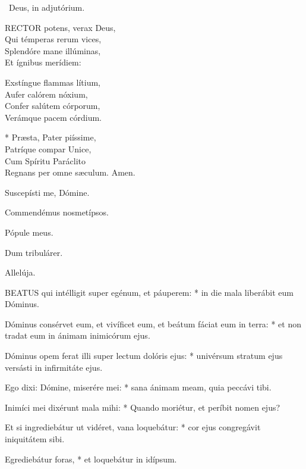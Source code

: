\V\ Deus, in adjutórium.


\lettrine[lines=2]{R}{ECTOR} potens, verax Deus,\\
Qui témperas rerum vices,\\
Splendóre mane illúminas,\\
Et ígnibus merídiem:

Exstíngue flammas lítium,\\
Aufer calórem nóxium,\\
Confer salútem córporum,\\
Verámque pacem córdium.

* Præsta, Pater piíssime,\\
Patríque compar Unice,\\
Cum Spíritu Paráclito\\
Regnans per omne sæculum. Amen.

  Suscepísti me, Dómine.



 Commendémus nosmetípsos.


 Pópule meus.


 Dum tribulárer.

  Allelúja.


\lettrine[lines=2]{B}{EATUS} qui intélligit super egénum, et páuperem: * in die mala liberábit eum Dóminus.

Dóminus consérvet eum, et vivíficet eum, et beátum fáciat eum in terra: * et non tradat eum in ánimam inimicórum ejus.

Dóminus opem ferat illi super lectum dolóris ejus: * univérsum stratum ejus versásti in infirmitáte ejus.

Ego dixi: Dómine, miserére mei: * sana ánimam meam, quia peccávi tibi.

Inimíci mei dixérunt mala mihi: * Quando moriétur, et períbit nomen ejus?

Et si ingrediebátur ut vidéret, vana loquebátur: * cor ejus congregávit iniquitátem sibi.

Egrediebátur foras, * et loquebátur in idípsum.

